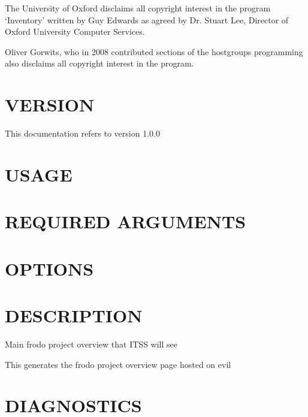 \documentclass{book}
\begin{document}
The University of Oxford disclaims all copyright interest in the program `Inventory' written by Guy Edwards as agreed by Dr. Stuart Lee, Director of Oxford University Computer Services.



Oliver Gorwits, who in 2008 contributed sections of the hostgroups programming also disclaims all copyright interest in the program.




\section{VERSION}
\label{_VERSION}
\hypertarget{_VERSION}{}



This documentation refers to version 1.0.0


\section{USAGE}
\label{_USAGE}
\hypertarget{_USAGE}{}


\section{REQUIRED ARGUMENTS}
\label{_REQUIRED_ARGUMENTS}
\hypertarget{_REQUIRED_ARGUMENTS}{}


\section{OPTIONS}
\label{_OPTIONS}
\hypertarget{_OPTIONS}{}


\section{DESCRIPTION}
\label{_DESCRIPTION}
\hypertarget{_DESCRIPTION}{}



Main frodo project overview that ITSS will see



This generates the frodo project overview page hosted on evil


\section{DIAGNOSTICS}
\label{_DIAGNOSTICS}
\hypertarget{_DIAGNOSTICS}{}
\end{document}
